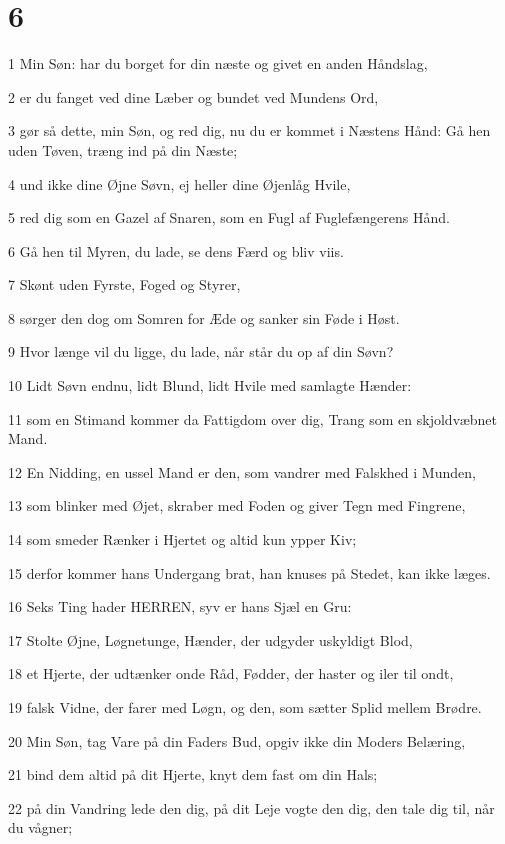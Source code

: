 \chapter{6}

\par 1 Min Søn: har du borget for din næste og givet en anden Håndslag,
\par 2 er du fanget ved dine Læber og bundet ved Mundens Ord,
\par 3 gør så dette, min Søn, og red dig, nu du er kommet i Næstens Hånd: Gå hen uden Tøven, træng ind på din Næste;
\par 4 und ikke dine Øjne Søvn, ej heller dine Øjenlåg Hvile,
\par 5 red dig som en Gazel af Snaren, som en Fugl af Fuglefængerens Hånd.
\par 6 Gå hen til Myren, du lade, se dens Færd og bliv viis.
\par 7 Skønt uden Fyrste, Foged og Styrer,
\par 8 sørger den dog om Somren for Æde og sanker sin Føde i Høst.
\par 9 Hvor længe vil du ligge, du lade, når står du op af din Søvn?
\par 10 Lidt Søvn endnu, lidt Blund, lidt Hvile med samlagte Hænder:
\par 11 som en Stimand kommer da Fattigdom over dig, Trang som en skjoldvæbnet Mand.
\par 12 En Nidding, en ussel Mand er den, som vandrer med Falskhed i Munden,
\par 13 som blinker med Øjet, skraber med Foden og giver Tegn med Fingrene,
\par 14 som smeder Rænker i Hjertet og altid kun ypper Kiv;
\par 15 derfor kommer hans Undergang brat, han knuses på Stedet, kan ikke læges.
\par 16 Seks Ting hader HERREN, syv er hans Sjæl en Gru:
\par 17 Stolte Øjne, Løgnetunge, Hænder, der udgyder uskyldigt Blod,
\par 18 et Hjerte, der udtænker onde Råd, Fødder, der haster og iler til ondt,
\par 19 falsk Vidne, der farer med Løgn, og den, som sætter Splid mellem Brødre.
\par 20 Min Søn, tag Vare på din Faders Bud, opgiv ikke din Moders Belæring,
\par 21 bind dem altid på dit Hjerte, knyt dem fast om din Hals;
\par 22 på din Vandring lede den dig, på dit Leje vogte den dig, den tale dig til, når du vågner;
